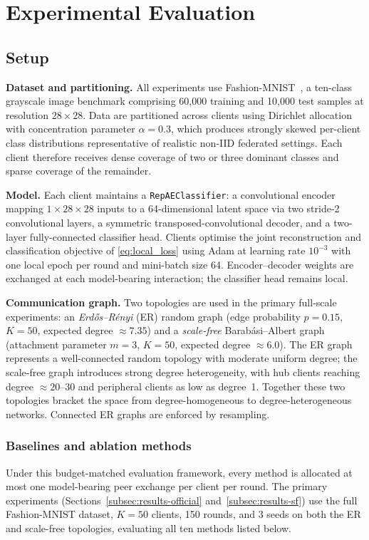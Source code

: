 \documentclass[conference]{IEEEtran}
\newcommand{\rev}[1]{{\color{red}#1}}
\begin{document}
\section{Experimental Evaluation}
\label{sec:experimental-evaluation}

\subsection{Setup}
\label{subsec:setup}

\textbf{Dataset and partitioning.}
All experiments use Fashion-MNIST~\cite{xiao2017fashion}, a ten-class grayscale image benchmark comprising 60{,}000 training and 10{,}000 test samples at resolution $28\times28$. Data are partitioned across clients using Dirichlet allocation with concentration parameter $\alpha=0.3$, which produces strongly skewed per-client class distributions representative of realistic non-IID federated settings. Each client therefore receives dense coverage of two or three dominant classes and sparse coverage of the remainder.

\textbf{Model.}
Each client maintains a \texttt{RepAEClassifier}: a convolutional encoder mapping $1\times28\times28$ inputs to a 64-dimensional latent space via two stride-2 convolutional layers, a symmetric transposed-convolutional decoder, and a two-layer fully-connected classifier head. Clients optimise the joint reconstruction and classification objective of \eqref{eq:local_loss} using Adam at learning rate $10^{-3}$ with one local epoch per round and mini-batch size 64. Encoder--decoder weights are exchanged at each model-bearing interaction; the classifier head remains local.

\textbf{Communication graph.}
Two topologies are used in the primary full-scale experiments: an \emph{Erd\H{o}s--R\'{e}nyi} (ER) random graph (edge probability $p=0.15$, $K=50$, expected degree $\approx7.35$) and a \emph{scale-free} Barab\'{a}si--Albert graph (attachment parameter $m=3$, $K=50$, expected degree $\approx6.0$). The ER graph represents a well-connected random topology with moderate uniform degree; the scale-free graph introduces strong degree heterogeneity, with hub clients reaching degree $\approx20$--30 and peripheral clients as low as degree~1. Together these two topologies bracket the space from degree-homogeneous to degree-heterogeneous networks. Connected ER graphs are enforced by resampling.

\subsubsection{\rev{Baselines and ablation methods}}
\label{subsec:baselines}
\rev{Under this budget-matched evaluation framework,} every method is allocated at most one model-bearing peer exchange per client per round. The primary experiments (Sections~\ref{subsec:results-official} and~\ref{subsec:results-sf}) use the full Fashion-MNIST dataset, $K=50$ clients, 150 rounds, and 3 seeds on both the ER and scale-free topologies, evaluating all ten methods listed below.
\end{document}
